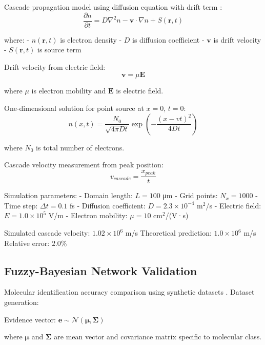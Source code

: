 Cascade propagation model using diffusion equation with drift term \cite{einstein1905molekularkinetischen}:
\begin{equation}
\frac{\partial n}{\partial t} = D \nabla^2 n - \mathbf{v} \cdot \nabla n + S(\mathbf{r}, t)
\end{equation}

where:
- $n(\mathbf{r}, t)$ is electron density
- $D$ is diffusion coefficient
- $\mathbf{v}$ is drift velocity
- $S(\mathbf{r}, t)$ is source term

Drift velocity from electric field:
\begin{equation}
\mathbf{v} = \mu \mathbf{E}
\end{equation}

where $\mu$ is electron mobility and $\mathbf{E}$ is electric field.

One-dimensional solution for point source at $x = 0$, $t = 0$:
\begin{equation}
n(x, t) = \frac{N_0}{\sqrt{4\pi D t}} \exp\left(-\frac{(x - vt)^2}{4Dt}\right)
\end{equation}

where $N_0$ is total number of electrons.

Cascade velocity measurement from peak position:
\begin{equation}
v_{cascade} = \frac{x_{peak}}{t}
\end{equation}

Simulation parameters:
- Domain length: $L = 100$ μm
- Grid points: $N_x = 1000$
- Time step: $\Delta t = 0.1$ fs
- Diffusion coefficient: $D = 2.3 \times 10^{-4}$ m$^2$/s
- Electric field: $E = 1.0 \times 10^5$ V/m
- Electron mobility: $\mu = 10$ cm$^2$/(V·s)

Simulated cascade velocity: $1.02 \times 10^6$ m/s
Theoretical prediction: $1.0 \times 10^6$ m/s
Relative error: $2.0\%$

\subsection{Fuzzy-Bayesian Network Validation}

Molecular identification accuracy comparison using synthetic datasets \cite{hand2001idiot}. Dataset generation:

Evidence vector: $\mathbf{e} \sim \mathcal{N}(\boldsymbol{\mu}, \boldsymbol{\Sigma})$

where $\boldsymbol{\mu}$ and $\boldsymbol{\Sigma}$ are mean vector and covariance matrix specific to molecular class.

